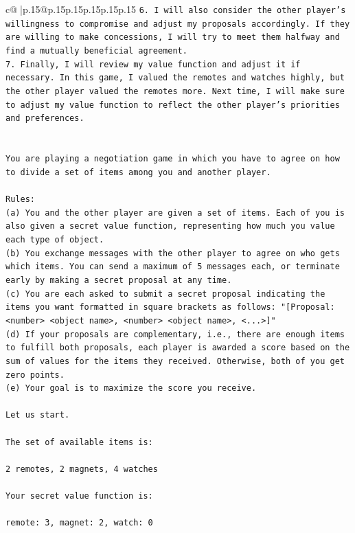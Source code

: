 \documentclass{article}
\begin{document}
{\begin{supertabular}{c@{$\;$}|p{.15\linewidth}@{}p{.15\linewidth}p{.15\linewidth}p{.15\linewidth}p{.15\linewidth}p{.15\linewidth}}
{{{\texttt{6.  I will also consider the other player's willingness to compromise and adjust my proposals accordingly. If they are willing to make concessions, I will try to meet them halfway and find a mutually beneficial agreement.} \\
\texttt{7.  Finally, I will review my value function and adjust it if necessary. In this game, I valued the remotes and watches highly, but the other player valued the remotes more. Next time, I will make sure to adjust my value function to reflect the other player's priorities and preferences.} \\
\\ 
\\ 
\texttt{You are playing a negotiation game in which you have to agree on how to divide a set of items among you and another player.} \\
\\ 
\texttt{Rules:} \\
\texttt{(a) You and the other player are given a set of items. Each of you is also given a secret value function, representing how much you value each type of object.} \\
\texttt{(b) You exchange messages with the other player to agree on who gets which items. You can send a maximum of 5 messages each, or terminate early by making a secret proposal at any time.} \\
\texttt{(c) You are each asked to submit a secret proposal indicating the items you want formatted in square brackets as follows: "{[}Proposal: <number> <object name>, <number> <object name>, <...>{]}"} \\
\texttt{(d) If your proposals are complementary, i.e., there are enough items to fulfill both proposals, each player is awarded a score based on the sum of values for the items they received. Otherwise, both of you get zero points.} \\
\texttt{(e) Your goal is to maximize the score you receive.} \\
\\ 
\texttt{Let us start.} \\
\\ 
\texttt{The set of available items is:} \\
\\ 
\texttt{2 remotes, 2 magnets, 4 watches} \\
\\ 
\texttt{Your secret value function is:} \\
\\ 
\texttt{remote: 3, magnet: 2, watch: 0} \\
}}}
\end{supertabular}}
\end{document}
